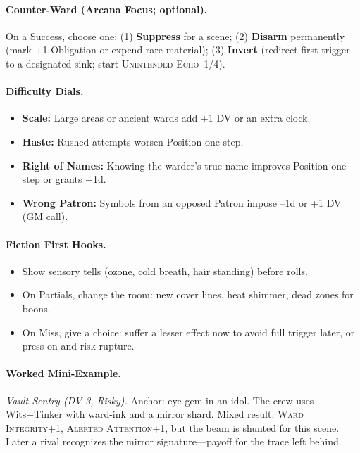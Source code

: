 \paragraph{Counter-Ward (Arcana Focus; optional).}
On a Success, choose one: (1) \textbf{Suppress} for a scene; (2) \textbf{Disarm} permanently (mark +1 Obligation or expend rare material); (3) \textbf{Invert} (redirect first trigger to a designated sink; start \textsc{Unintended Echo}~1/4).

\paragraph{Difficulty Dials.}
\begin{itemize}
\item \textbf{Scale:} Large areas or ancient wards add +1 DV or an extra clock.
\item \textbf{Haste:} Rushed attempts worsen Position one step.
\item \textbf{Right of Names:} Knowing the warder’s true name improves Position one step or grants +1d.
\item \textbf{Wrong Patron:} Symbols from an opposed Patron impose –1d or +1 DV (GM call).
\end{itemize}

\paragraph{Fiction First Hooks.}
\begin{itemize}
\item Show sensory tells (ozone, cold breath, hair standing) before rolls.
\item On Partials, change the room: new cover lines, heat shimmer, dead zones for boons.
\item On Miss, give a choice: suffer a lesser effect now to avoid full trigger later, or press on and risk rupture.
\end{itemize}

\paragraph{Worked Mini-Example.}
\emph{Vault Sentry (DV 3, Risky).} Anchor: eye-gem in an idol. The crew uses Wits+Tinker with ward-ink and a mirror shard. Mixed result: \textsc{Ward Integrity}+1, \textsc{Alerted Attention}+1, but the beam is shunted for this scene. Later a rival recognizes the mirror signature—payoff for the trace left behind.

